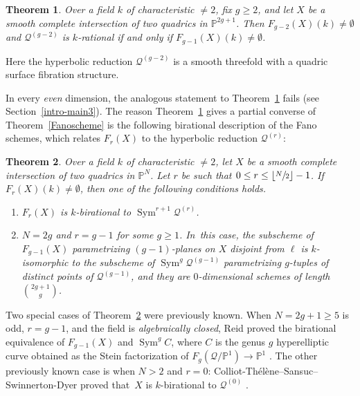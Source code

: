\documentclass[JEP,XML,SOM,Unicode,NoEqCountersInSection,published]{cedram}
\let\cal\mathcal
\theoremstyle{plain}
\newtheorem{thm}{Theorem}[section]
\theoremstyle{definition}
\DeclareMathOperator{\Sym}{Sym}
\renewcommand\P{\mathbb{P}}
\begin{document}
\begin{thm}\label{maximallinearspace}
Over a field $k$ of characteristic $\neq 2$,
fix $g\geq 2$,
and let $X$ be a smooth complete intersection of two quadrics in $\P^{2g+1}$.
Then
$F_{g-2}(X)(k)\neq \emptyset$ and
$\mathcal{Q}^{(g-2)}$ is $k$\nobreakdash-rational
if and only if
$F_{g-1}(X)(k)\neq \emptyset$.
\end{thm}
Here the hyperbolic reduction $\mathcal{Q}^{(g-2)}$ is a smooth threefold with a quadric surface fibration structure.

In every \emph{even} dimension, the analogous statement to Theorem~\ref{maximallinearspace} fails (see Section~\ref{intro-main3}).
The reason Theorem~\ref{maximallinearspace} gives a partial converse of Theorem~\ref{Fanoscheme} is the following birational description of the Fano schemes, which relates \(F_r(X)\) to the hyperbolic reduction \(\cal Q^{(r)}\):

\begin{thm}\label{thm:symmetric}
Over a field $k$ of characteristic $\neq 2$, let $X$ be a smooth complete intersection of two quadrics in $\P^N$.
Let $r$ be such that $0\leq r\leq \lfloor \sfrac{N}{2}\rfloor -1$. If~$F_r(X)(k)\neq \emptyset$, then one of the following conditions holds.
\begin{enumerate}
\item\label{thm:symmetric1} $F_r(X)$ is $k$\nobreakdash-birational to $\Sym^{r+1}\mathcal{Q}^{(r)}$.
\item\label{thm:symmetric2} $N=2g$ and $r=g-1$ for some $g\geq 1$. In~this case,
the subscheme of $F_{g-1}(X)$ parametrizing $(g-1)$-planes on $X$
disjoint from $\ell$ is $k$\nobreakdash-isomorphic to
the subscheme of $\Sym^{g}\mathcal{Q}^{(g-1)}$ parametrizing $g$-tuples of distinct points of $\mathcal{Q}^{(g-1)}$, and they are \(0\)\nobreakdash-dimensional schemes of length $\binom{2g+1}{g}$.
\end{enumerate}
\end{thm}
Two special cases of Theorem~\ref{thm:symmetric} were previously known. When
$N=2g+1 \geq 5$ is odd, $r=g-1$, and the field is \emph{algebraically closed},
Reid proved the birational equivalence of $F_{g-1}(X)$ and $\Sym^g C$, where \(C\) is the genus \(g\) hyperelliptic curve obtained as the Stein factorization of $F_{g}(\mathcal{Q}/\P^1)\to \P^1$ \cite[\S 4]{Reid-thesis}. The other previously known case is when $N>2$ and $r=0$: Colliot-Thélène--Sansuc--Swinnerton-Dyer proved that~$X$ is $k$\nobreakdash-birational to $\mathcal{Q}^{(0)}$ \cite[Th.\,3.2]{CTSSD}.
\end{document}
